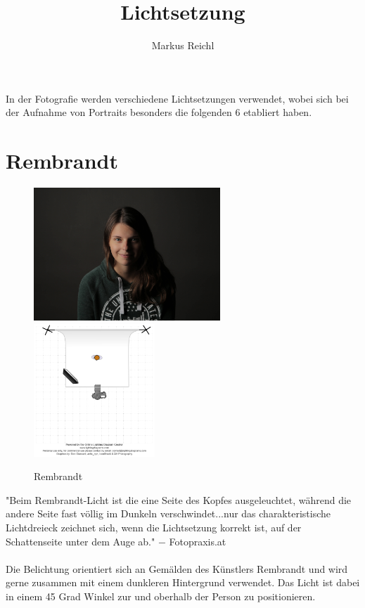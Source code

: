 \documentclass{school}
\title{Lichtsetzung}
\author{Markus Reichl}
\begin{document}
\maketitle
\thispagestyle{fancy}

In der Fotografie werden verschiedene Lichtsetzungen verwendet, wobei sich bei der Aufnahme von Portraits besonders die folgenden 6 etabliert haben.

\section{Rembrandt}
\begin{figure}[h]
	\centering
	\includegraphics[height=5cm]{1-rembrandt.jpg}
	\includegraphics[height=5cm]{1-rembrandt-diagram.png}
	\caption{Rembrandt}
\end{figure}

"Beim Rembrandt-Licht ist die eine Seite des Kopfes ausgeleuchtet, während die andere Seite fast völlig im Dunkeln verschwindet...nur das charakteristische Lichtdreieck zeichnet sich, wenn die Lichtsetzung korrekt ist, auf der Schattenseite unter dem Auge ab."
$-$ Fotopraxis.at \cite{fp-rembrandt}
\\\\
Die Belichtung orientiert sich an Gemälden des Künstlers Rembrandt und wird gerne zusammen mit einem dunkleren Hintergrund verwendet. Das Licht ist dabei in einem 45 Grad Winkel zur und oberhalb der Person zu positionieren.

\newpage
\end{document}
